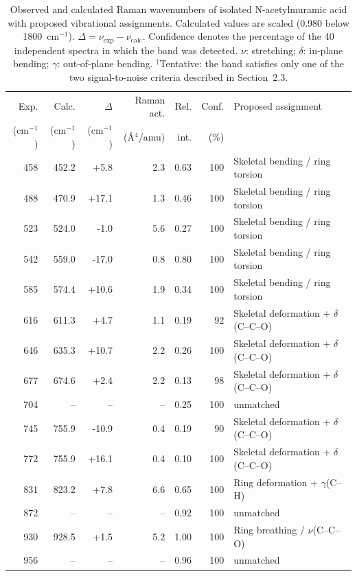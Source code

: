 \documentclass[preprint,12pt]{elsarticle}
\newcommand{\wn}{\ensuremath{\mathrm{cm}^{-1}}}
\begin{document}
\begin{table}[htbp]
\centering
\caption{Observed and calculated Raman wavenumbers of isolated
N-acetylmuramic acid with proposed vibrational assignments.
Calculated values are scaled (0.980 below 1800~\wn{}).
$\Delta = \nu_{\mathrm{exp}} - \nu_{\mathrm{calc}}$. Confidence denotes the
percentage of the 40 independent spectra in which the band was detected.
$\nu$: stretching; $\delta$: in-plane bending; $\gamma$: out-of-plane bending.
$^{\dagger}$Tentative: the band satisfies only one of the two signal-to-noise
criteria described in Section~2.3.}
\label{tab:comparison}
\small
\begin{tabular}{rrrrrrp{4.6cm}}
\toprule
Exp. & Calc. & $\Delta$ & Raman act. & Rel. & Conf. & Proposed assignment \\
(\wn{}) & (\wn{}) & (\wn{}) & (\AA$^4$/amu) & int. & (\%) & \\
\midrule
458 & 452.2 & +5.8 & 2.3 & 0.63 & 100 & Skeletal bending / ring torsion \\
488 & 470.9 & +17.1 & 1.3 & 0.46 & 100 & Skeletal bending / ring torsion \\
523 & 524.0 & -1.0 & 5.6 & 0.27 & 100 & Skeletal bending / ring torsion \\
542 & 559.0 & -17.0 & 0.8 & 0.80 & 100 & Skeletal bending / ring torsion \\
585 & 574.4 & +10.6 & 1.9 & 0.34 & 100 & Skeletal bending / ring torsion \\
616 & 611.3 & +4.7 & 1.1 & 0.19 & 92 & Skeletal deformation + $\delta$(C--C--O) \\
646 & 635.3 & +10.7 & 2.2 & 0.26 & 100 & Skeletal deformation + $\delta$(C--C--O) \\
677 & 674.6 & +2.4 & 2.2 & 0.13 & 98 & Skeletal deformation + $\delta$(C--C--O) \\
704 & -- & -- & -- & 0.25 & 100 & unmatched \\
745 & 755.9 & -10.9 & 0.4 & 0.19 & 90 & Skeletal deformation + $\delta$(C--C--O) \\
772 & 755.9 & +16.1 & 0.4 & 0.10 & 100 & Skeletal deformation + $\delta$(C--C--O) \\
831 & 823.2 & +7.8 & 6.6 & 0.65 & 100 & Ring deformation + $\gamma$(C--H) \\
872 & -- & -- & -- & 0.92 & 100 & unmatched \\
930 & 928.5 & +1.5 & 5.2 & 1.00 & 100 & Ring breathing / $\nu$(C--C--O) \\
956 & -- & -- & -- & 0.96 & 100 & unmatched \\

\end{tabular}
\end{table}
\end{document}
